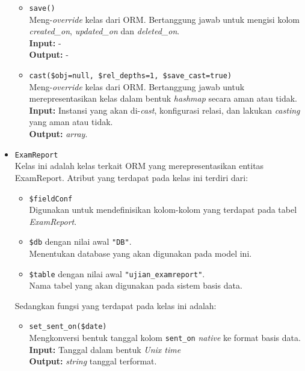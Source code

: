 \begin{itemize}
\begin{itemize}
                \item \texttt{save()}\\
                    Meng-\textit{override} kelas dari ORM. Bertanggung jawab untuk mengisi
                    kolom \textit{created\_on}, \textit{updated\_on} dan \textit{deleted\_on}.\\
                    \textbf{Input:} -\\
                    \textbf{Output:} -
                
                \item \texttt{cast(\$obj=null, \$rel\_depths=1, \$save\_cast=true)}\\
                    Meng-\textit{override} kelas dari ORM. Bertanggung jawab untuk merepresentasikan
                    kelas dalam bentuk \textit{hashmap} secara aman atau tidak. \\
                    \textbf{Input:} Instansi yang akan di-\textit{cast}, konfigurasi relasi, dan
                        lakukan \textit{casting} yang aman atau tidak.\\
                    \textbf{Output:} \textit{array}.
            \end{itemize}
            
        \item \texttt{ExamReport} \\
            Kelas ini adalah kelas terkait ORM yang merepresentasikan entitas ExamReport. Atribut yang 
            terdapat pada kelas ini terdiri dari:
            \begin{itemize}
                \item \texttt{\$fieldConf} \\
                    Digunakan untuk mendefinisikan kolom-kolom yang terdapat pada tabel \textit{ExamReport}.
                \item \texttt{\$db} dengan nilai awal \texttt{"DB"}. \\
                    Menentukan database yang akan digunakan pada model ini.
                \item \texttt{\$table} dengan nilai awal \texttt{"ujian\_examreport"}. \\
                    Nama tabel yang akan digunakan pada sistem basis data. 
            \end{itemize}
            Sedangkan fungsi yang terdapat pada kelas ini adalah:
            \begin{itemize}
                \item \texttt{set\_sent\_on(\$date)} \\
                    Mengkonversi bentuk tanggal kolom \texttt{sent\_on} \textit{native} ke 
                    format basis data. \\
                    \textbf{Input:} Tanggal dalam bentuk \textit{Unix time}\\
                    \textbf{Output:} \textit{string} tanggal terformat.
                    

\end{itemize}
\end{itemize}
